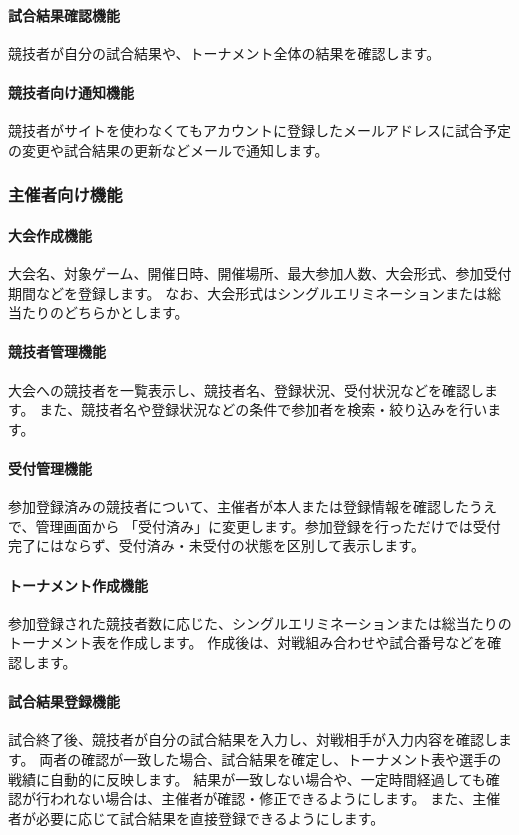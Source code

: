 \paragraph{試合結果確認機能}
競技者が自分の試合結果や、トーナメント全体の結果を確認します。

\paragraph{競技者向け通知機能}
競技者がサイトを使わなくてもアカウントに登録したメールアドレスに試合予定の変更や試合結果の更新などメールで通知します。

\subsubsection{主催者向け機能}

\paragraph{大会作成機能}
大会名、対象ゲーム、開催日時、開催場所、最大参加人数、大会形式、参加受付期間などを登録します。
なお、大会形式はシングルエリミネーションまたは総当たりのどちらかとします。

\paragraph{競技者管理機能}
大会への競技者を一覧表示し、競技者名、登録状況、受付状況などを確認します。
また、競技者名や登録状況などの条件で参加者を検索・絞り込みを行います。

\paragraph{受付管理機能}
参加登録済みの競技者について、主催者が本人または登録情報を確認したうえで、管理画面から
「受付済み」に変更します。参加登録を行っただけでは受付完了にはならず、受付済み・未受付の状態を区別して表示します。

\paragraph{トーナメント作成機能}
参加登録された競技者数に応じた、シングルエリミネーションまたは総当たりのトーナメント表を作成します。
作成後は、対戦組み合わせや試合番号などを確認します。

\paragraph{試合結果登録機能}
試合終了後、競技者が自分の試合結果を入力し、対戦相手が入力内容を確認します。
両者の確認が一致した場合、試合結果を確定し、トーナメント表や選手の戦績に自動的に反映します。
結果が一致しない場合や、一定時間経過しても確認が行われない場合は、主催者が確認・修正できるようにします。
また、主催者が必要に応じて試合結果を直接登録できるようにします。

